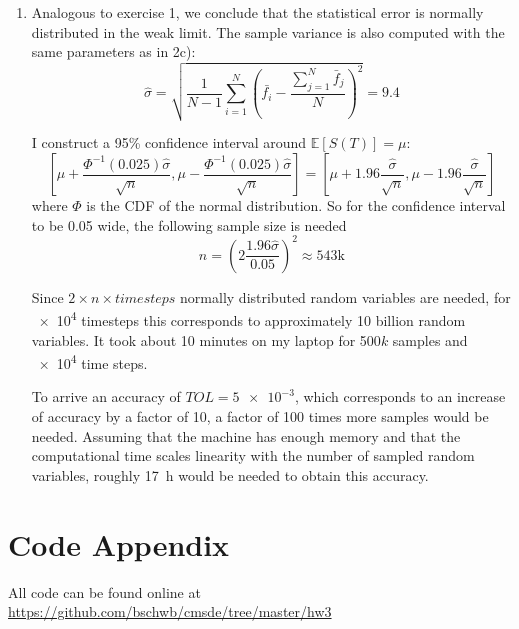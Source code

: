 \documentclass[a4paper,11pt]{scrartcl}
\newcommand*{\E}{\mathbb{E}}
\newcommand*{\EV}[1]{\E\left[{#1}\right]}
\begin{document}
\begin{enumerate}
\begin{enumerate}[leftmargin=1em]
    With \num{e4} Monte Carlo samples and \num{e4} equidistant time steps I
    get for the option value
    \[ f(0, S_0) = e^{-rT} \EV{\max{(S(T) - K, 0)}} = \num{7.02}\]

  \item
    Analogous to exercise 1, we conclude that the statistical error is normally
    distributed in the weak limit.
    The sample variance is also computed with the same parameters
    as in 2c):
    \[ \hat{\sigma} = \sqrt{\frac{1}{N - 1} \sum_{i=1}^N \left( \bar{f_i}  -
        \frac{\sum^N_{j=1}  \bar{f}_j}{N} \right)^2} = \num{9.4} \]

    I construct a 95\% confidence interval around $\EV{S(T)} = \mu$:
    \[ \left[\mu + \frac{\Phi^{-1}(0.025)\hat{\sigma}}{\sqrt{n}},
        \mu - \frac{\Phi^{-1}(0.025)\hat{\sigma}}{\sqrt{n}}\right]
      = \left[\mu + 1.96 \frac{\hat{\sigma}}{\sqrt{n}},
         \mu - 1.96 \frac{\hat{\sigma}}{\sqrt{n}} \right]
    \]
  where $\Phi$ is the CDF of the normal distribution.
  So for the confidence interval to be \num{0.05} wide, the following sample
  size is needed
  \[ n = \left(2\frac{1.96 \hat{\sigma}}{0.05}\right)^2 \approx 543\text{k} \]

  Since $2 \times n \times timesteps$ normally distributed random variables are
  needed, for \num{e4} timesteps this corresponds to approximately 10 billion
  random variables.
  It took about 10 minutes on my laptop for 500$k$ samples and \num{e4}
  time steps.

  To arrive an accuracy of $TOL=\num{5e-3}$, which corresponds to an increase of
  accuracy by a factor of 10, a factor of 100 times more samples would be needed.
  Assuming that the machine has enough memory and that the computational time scales
  linearity with the number of sampled random variables, roughly \SI{17}{\hour}
  would be needed to obtain this accuracy.
    
\end{enumerate}

\end{enumerate}

\section*{Code Appendix}

All code can be found online at
\url{https://github.com/bschwb/cmsde/tree/master/hw3}






\end{document}
